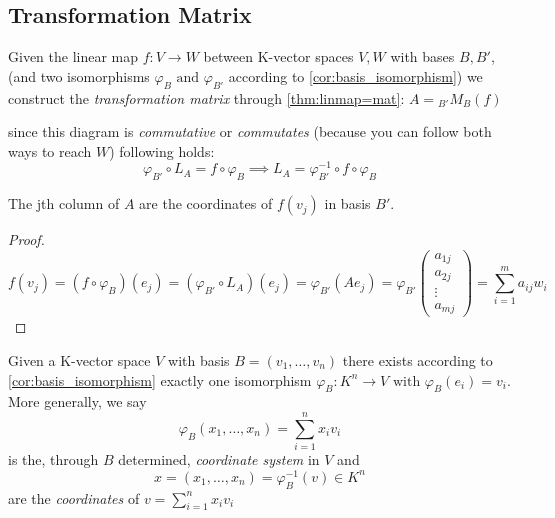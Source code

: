 \subsection{Transformation Matrix}
\begin{proposition}\label{pro:transmat_linearmap}
   Given the linear map \(f: V \to W\) between K-vector spaces \(V, W\) with bases \(B, B'\), (and two isomorphisms \(\varphi_{B} \text{ and } \varphi_{B'}\) according to \cref{cor:basis_isomorphism}) we construct the \textit{transformation matrix} through \cref{thm:linmap=mat}: \(A = {}_{B'}M_{B}(f)\)

   \begin{center}
   \end{center}

   since this diagram is \textit{commutative} or \textit{commutates} (because you can follow both ways to reach \(W\)) following holds:
   \[\varphi_{B'} \circ L_{A} = f \circ \varphi_{B} \implies L_{A} = \varphi_{B'}^{-1} \circ f \circ \varphi_{B}\]
\end{proposition}
\begin{remark}
   The jth column of \(A\) are the coordinates of \(f(v_j)\) in basis \(B'\).
\end{remark}
\begin{proof}
   \[f(v_j) = (f \circ \varphi_{B})(e_j) = (\varphi_{B'} \circ L_{A})(e_j) = \varphi_{B'}(A e_j) = \varphi_{B'}\begin{pmatrix} a_{1j} \\ a_{2j} \\ \vdots \\ a_{mj} \end{pmatrix} = \sum_{i=1}^m a_{ij} w_i\]
\end{proof}

\begin{definition}\label{def:coord_system}
   Given a K-vector space \(V\) with basis \(B = (v_1, \ldots, v_n)\) there exists according to \cref{cor:basis_isomorphism} exactly one isomorphism \(\varphi_{B}: K^n \to V \text{ with } \varphi_{B}(e_i) = v_i\).
   More generally, we say
   \[\varphi_{B}(x_1, \ldots, x_n) = \sum_{i=1}^n x_i v_i\]
   is the, through \(B\) determined, \textit{coordinate system} in \(V\) and
   \[x = (x_1, \ldots, x_n) = \varphi_{B}^{-1}(v) \in K^n\]
   are the \textit{coordinates} of \(v = \sum_{i=1}^n x_i v_i\)
\end{definition}

